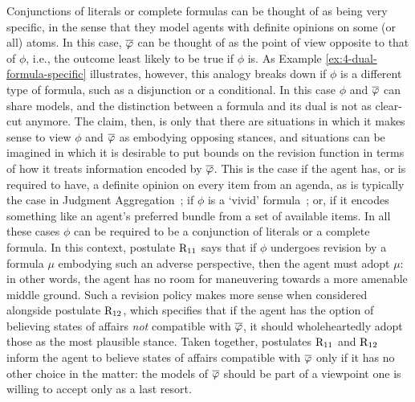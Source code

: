Conjunctions of literals or complete formulas can be thought of as being very specific,
in the sense that they model agents with definite opinions on some (or all) atoms.
In this case, $\overline{\varphi}$ can be thought of as the point of view opposite to that of $\phi$,
i.e., the outcome least likely to be true if $\phi$ is.
As Example \ref{ex:4-dual-formula-specific} illustrates, however,
this analogy breaks down if $\phi$ is a different type of formula, such as a disjunction or a conditional.
In this case $\phi$ and $\overline{\varphi}$ can share models, and the distinction between a formula and its dual
is not as clear-cut anymore.
The claim, then, is only that there are situations in which 
it makes sense to view $\phi$ and $\overline{\varphi}$
as embodying opposing stances,
and situations can be imagined in which it is desirable to put bounds on the revision
function in terms of how it treats information encoded by $\overline{\varphi}$.
This is the case if the agent has, or is required to have, a definite opinion on every item from an agenda,
as is typically the case in Judgment Aggregation~\cite{Endriss16};
if $\phi$ is a `vivid' formula~\cite{Levesque86};
or, if it encodes something like an agent's preferred bundle from a set of available items.
In all these cases $\phi$ can be required to be a conjunction of literals or a complete formula.
In this context, postulate $\mathrm{R}_{11}$ says that if $\phi$ undergoes revision by 
a formula $\mu$ embodying such an adverse perspective,
then the agent must adopt $\mu$:
in other words, the agent has no room for maneuvering towards a more amenable middle ground.
Such a revision policy makes more sense when considered alongside postulate $\mathrm{R}_{12}$, %
which specifies that if the agent has the option of believing
states of affairs \emph{not} compatible with $\overline{\varphi}$,
it should wholeheartedly adopt those as the most plausible stance.
Taken together, postulates $\mathrm{R}_{11}$ and $\mathrm{R}_{12}$
inform the agent to believe states of affairs
compatible with $\overline{\varphi}$ only if it has no other choice in the matter:
the models of $\overline{\varphi}$
should be part of a viewpoint one is willing to accept
only as a last resort. 

